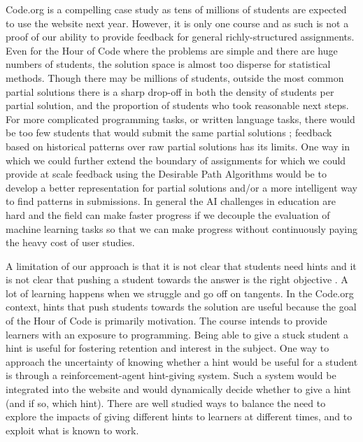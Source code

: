 Code.org is a compelling case study as tens of millions of students are expected to use the website next year. However, it is only one course and as such is not a proof of our ability to provide feedback for general richly-structured assignments. Even for the Hour of Code where the problems are simple and there are huge numbers of students, the solution space is almost too disperse for statistical methods. Though there may be millions of students, outside the most common partial solutions there is a sharp drop-off in both the density of students per partial solution, and the proportion of students who took reasonable next steps.  For more complicated programming tasks, or written language tasks, there would be too few students that would submit the same partial solutions \cite{huang2013syntactic}; feedback based on historical patterns over raw partial solutions has its limits. One way in which we could further extend the boundary of assignments for which we could provide at scale feedback using the Desirable Path Algorithms would be to develop a better representation for partial solutions and/or a more intelligent way to find patterns in submissions. In general the AI challenges in education are hard and the field can make faster progress if we decouple the evaluation of machine learning tasks so that we can make progress without continuously paying the heavy cost of user studies.

A limitation of our approach is that it is not clear that students need hints and it is not clear that pushing a student towards the answer is the right objective \cite{roll2014benefits}. A lot of learning happens when we struggle and go off on tangents. In the Code.org context, hints that push students towards the solution are useful because the goal of the Hour of Code is primarily motivation. The course intends to provide learners with an exposure to programming. Being able to give a stuck student a hint is useful for fostering retention and interest in the subject. One way to approach the uncertainty of knowing whether a hint would be useful for a student is through a reinforcement-agent hint-giving system. Such a system would be integrated into the website and would dynamically decide whether to give a hint (and if so, which hint). There are well studied ways to balance the need to explore the impacts of giving different hints to learners at different times, and to exploit what is known to work. 

